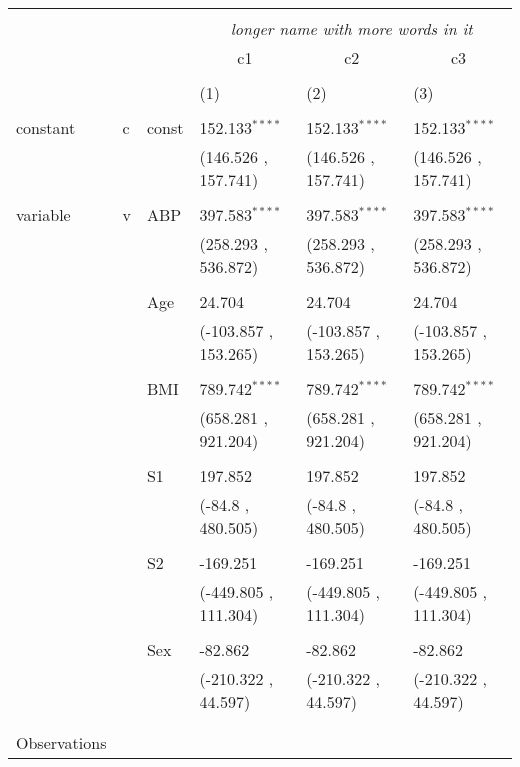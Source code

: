 \begin{table}[!htbp] \centering
  \label{}
\begin{tabularx}{\textwidth}{lllXXX}
\\[-1.8ex]\hline
\hline \\[-1.8ex]
&&&\multicolumn{3}{c}{\textit{longer name with more words in it}} \
\cr \cline{4-6}
\\[-1.8ex]&&& \multicolumn{1}{c}{c1} & \multicolumn{1}{c}{c2} & \multicolumn{1}{c}{c3}  \\
\\[-1.8ex] & && (1) & (2) & (3) \\
\hline \\[-1.8ex]
 constant&c&const& 152.133$^{****}$ & 152.133$^{****}$ & 152.133$^{****}$ \\
&&&(146.526 , 157.741)&(146.526 , 157.741)&(146.526 , 157.741)\\
  & & & \\
 variable&v&ABP& 397.583$^{****}$ & 397.583$^{****}$ & 397.583$^{****}$ \\
&&&(258.293 , 536.872)&(258.293 , 536.872)&(258.293 , 536.872)\\
  & & & \\
 &&Age& 24.704$^{}$ & 24.704$^{}$ & 24.704$^{}$ \\
&&&(-103.857 , 153.265)&(-103.857 , 153.265)&(-103.857 , 153.265)\\
  & & & \\
 &&BMI& 789.742$^{****}$ & 789.742$^{****}$ & 789.742$^{****}$ \\
&&&(658.281 , 921.204)&(658.281 , 921.204)&(658.281 , 921.204)\\
  & & & \\
 &&S1& 197.852$^{}$ & 197.852$^{}$ & 197.852$^{}$ \\
&&&(-84.8 , 480.505)&(-84.8 , 480.505)&(-84.8 , 480.505)\\
  & & & \\
 &&S2& -169.251$^{}$ & -169.251$^{}$ & -169.251$^{}$ \\
&&&(-449.805 , 111.304)&(-449.805 , 111.304)&(-449.805 , 111.304)\\
  & & & \\
 &&Sex& -82.862$^{}$ & -82.862$^{}$ & -82.862$^{}$ \\
&&&(-210.322 , 44.597)&(-210.322 , 44.597)&(-210.322 , 44.597)\\
  & & & \\
\hline \\[-1.8ex]
 Observations\quad &&&   &   &   \\

\end{tabularx}
\end{table}
